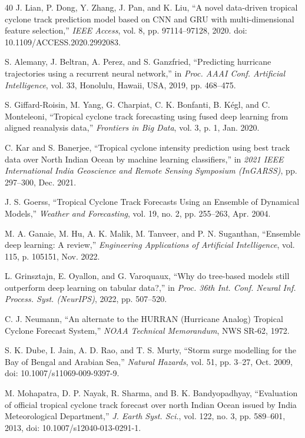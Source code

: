 \documentclass[10pt,twocolumn,a4paper]{article}
\begin{document}
\begin{thebibliography}{40}
J. Lian, P. Dong, Y. Zhang, J. Pan, and K. Liu, ``A novel data-driven tropical cyclone track prediction model based on CNN and GRU with multi-dimensional feature selection,'' \textit{IEEE Access}, vol. 8, pp. 97114--97128, 2020. doi: 10.1109/ACCESS.2020.2992083.

S. Alemany, J. Beltran, A. Perez, and S. Ganzfried, ``Predicting hurricane trajectories using a recurrent neural network,'' in \textit{Proc. AAAI Conf. Artificial Intelligence}, vol. 33, Honolulu, Hawaii, USA, 2019, pp. 468--475.

S. Giffard-Roisin, M. Yang, G. Charpiat, C. K. Bonfanti, B. K\'{e}gl, and C. Monteleoni, ``Tropical cyclone track forecasting using fused deep learning from aligned reanalysis data,'' \textit{Frontiers in Big Data}, vol. 3, p. 1, Jan. 2020.

C. Kar and S. Banerjee, ``Tropical cyclone intensity prediction using best track data over North Indian Ocean by machine learning classifiers,'' in \textit{2021 IEEE International India Geoscience and Remote Sensing Symposium (InGARSS)}, pp. 297--300, Dec. 2021.

J. S. Goerss, ``Tropical Cyclone Track Forecasts Using an Ensemble of Dynamical Models,'' \textit{Weather and Forecasting}, vol. 19, no. 2, pp. 255--263, Apr. 2004.

M. A. Ganaie, M. Hu, A. K. Malik, M. Tanveer, and P. N. Suganthan, ``Ensemble deep learning: A review,'' \textit{Engineering Applications of Artificial Intelligence}, vol. 115, p. 105151, Nov. 2022.

L. Grinsztajn, E. Oyallon, and G. Varoquaux, ``Why do tree-based models still outperform deep learning on tabular data?,'' in \textit{Proc. 36th Int. Conf. Neural Inf. Process. Syst. (NeurIPS)}, 2022, pp. 507--520.

C. J. Neumann, ``An alternate to the HURRAN (Hurricane Analog) Tropical Cyclone Forecast System,'' \textit{NOAA Technical Memorandum}, NWS SR-62, 1972.

S. K. Dube, I. Jain, A. D. Rao, and T. S. Murty, ``Storm surge modelling for the Bay of Bengal and Arabian Sea,'' \textit{Natural Hazards}, vol. 51, pp. 3--27, Oct. 2009, doi: 10.1007/s11069-009-9397-9.

M. Mohapatra, D. P. Nayak, R. Sharma, and B. K. Bandyopadhyay, ``Evaluation of official tropical cyclone track forecast over north Indian Ocean issued by India Meteorological Department,'' \textit{J. Earth Syst. Sci.}, vol. 122, no. 3, pp. 589--601, 2013, doi: 10.1007/s12040-013-0291-1.


\end{thebibliography}
\end{document}
